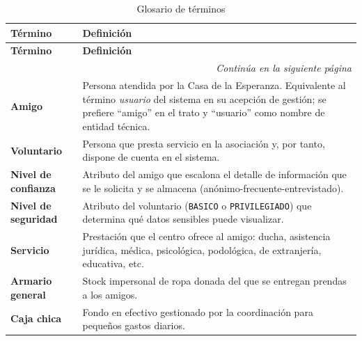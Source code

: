 \begin{longtable}[]{@{}
        p{}
        p{}@{}}

    \caption{Glosario de términos} \\

    \toprule
    \textbf{Término} & \textbf{Definición} \\
    \midrule
    \endfirsthead %

    \toprule
    \textbf{Término} & \textbf{Definición} \\
    \midrule
    \endhead %

    \midrule
    \multicolumn{2}{r}{\small\emph{Continúa en la siguiente página}} \\
    \endfoot %

    \bottomrule
    \endlastfoot %

    \textbf{Amigo} & Persona atendida por la Casa de la Esperanza.
    Equivalente al término \emph{usuario} del sistema en su acepción de
    gestión; se prefiere ``amigo'' en el trato y ``usuario'' como nombre de
    entidad técnica. \\
    \midrule

    \textbf{Voluntario} & Persona que presta servicio en la asociación y,
    por tanto, dispone de cuenta en el sistema. \\
    \midrule

    \textbf{Nivel de confianza} & Atributo del amigo que escalona el detalle
    de información que se le solicita y se almacena (anónimo-frecuente-entrevistado). \\
    \midrule

    \textbf{Nivel de seguridad} & Atributo del voluntario (\texttt{BASICO} o \texttt{PRIVILEGIADO}) que determina qué datos sensibles puede visualizar. \\
    \midrule

    \textbf{Servicio} & Prestación que el centro ofrece al amigo: ducha,
    asistencia jurídica, médica, psicológica, podológica, de extranjería,
    educativa, etc. \\
    \midrule

    \textbf{Armario general} & Stock impersonal de ropa donada del que se
    entregan prendas a los amigos. \\
    \midrule

    \textbf{Caja chica} & Fondo en efectivo gestionado por la coordinación
    para pequeños gastos diarios. \\
    \midrule


\end{longtable}
